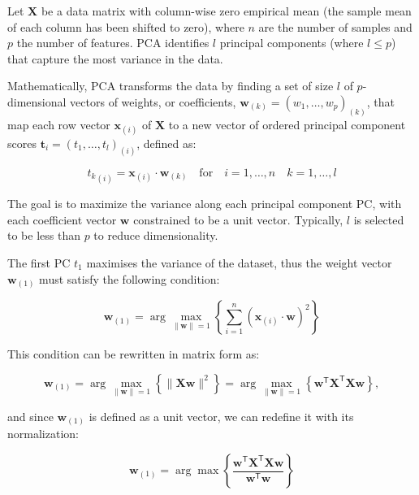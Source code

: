 Let $\mathbf{X}$ be a data matrix with column-wise zero empirical mean (the sample mean of each column has been shifted to zero), where $n$ are the number of samples and $p$ the number of features. PCA identifies $l$ principal components (where $l \leq p$) that capture the most variance in the data.

Mathematically, PCA transforms the data by finding a set of size $l$ of $p$-dimensional vectors of weights, or coefficients, $\mathbf{w}_{(k)} = (w_1, \ldots, w_p)_{(k)}$, that map each row vector $\mathbf{x}_{(i)}$ of $\mathbf{X}$ to a new vector of ordered principal component scores $\mathbf{t}_{i} = (t_1, \ldots, t_l)_{(i)}$, defined as:

\begin{equation}
{t_{k}}_{(i)} = \mathbf{x}_{(i)} \cdot \mathbf{w}_{(k)} \quad \text{for} \quad i = 1, \ldots, n \quad k = 1, \ldots, l
\end{equation}

The goal is to maximize the variance along each principal component PC, with each coefficient vector \(\mathbf{w}\) constrained to be a unit vector. Typically, \(l\) is selected to be less than \(p\) to reduce dimensionality.


The first PC $t_{1}$ maximises the variance of the dataset, thus the weight vector \(\mathbf{w}_{(1)}\) must satisfy the following condition:

\begin{equation}
\mathbf{w}_{(1)} = \arg \max_{\|\mathbf{w}\| = 1} \left\{ \sum_{i=1}^{n} \left( \mathbf{x}_{(i)} \cdot \mathbf{w} \right)^2 \right\}
\end{equation}

This condition can be rewritten in matrix form as:

\begin{equation}
\mathbf{w}_{(1)} = \arg \max_{\|\mathbf{w}\| = 1} \left\{ \|\mathbf{Xw}\|^2 \right\} = \arg \max_{\|\mathbf{w}\| = 1} \left\{ \mathbf{w}^{\mathsf{T}} \mathbf{X}^{\mathsf{T}} \mathbf{Xw} \right\},
\end{equation}

and since $\mathbf{w}_{(1)}$ is defined as a unit vector, we can redefine it with its normalization:

\begin{equation}
\mathbf{w}_{(1)} = \arg \max \left\{ \frac{\mathbf{w}^{\mathsf{T}} \mathbf{X}^{\mathsf{T}} \mathbf{Xw}}{\mathbf{w}^{\mathsf{T}} \mathbf{w}} \right\}\label{first_weight}
\end{equation}

